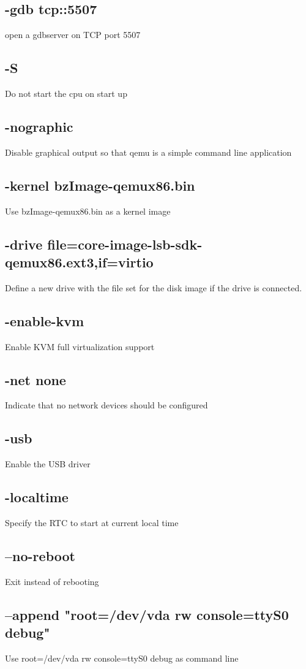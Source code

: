 \documentclass[letterpaper,10pt,titlepage,draftclsnofoot,onecolumn]{IEEEtran}
\begin{document}
\subsection{-gdb tcp::5507}
open a gdbserver on TCP port 5507
\subsection{-S}
Do not start the cpu on start up
\subsection{-nographic}
Disable graphical output so that qemu is a simple command line application
\subsection{-kernel bzImage-qemux86.bin }
Use bzImage-qemux86.bin as a kernel image
\subsection{-drive file=core-image-lsb-sdk-qemux86.ext3,if=virtio }
Define a new drive with the file set for the disk image if the drive is connected.
\subsection{-enable-kvm }
Enable KVM full virtualization support
\subsection{-net none }
Indicate that no network devices should be configured
\subsection{-usb }
Enable the USB driver
\subsection{-localtime }
Specify the RTC to start at current local time
\subsection{--no-reboot}
Exit instead of rebooting 
\subsection{--append "root=/dev/vda rw console=ttyS0 debug"}
Use root=/dev/vda rw console=ttyS0 debug as command line
\end{document}
